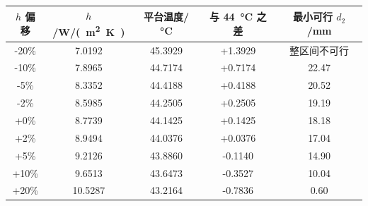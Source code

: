 \begin{tabular}{ccccc}
  \toprule
    $h$ 偏移 & $h$/\si{W/(m^2.K)} & 平台温度/\si{\celsius} & 与 \SI{44}{\celsius} 之差 & 最小可行 $d_2$/\si{mm} \\
  \midrule
    -20\% & 7.0192 & 45.3929 & +1.3929 & 整区间不可行 \\
    -10\% & 7.8965 & 44.7174 & +0.7174 & 22.47 \\
    -5\% & 8.3352 & 44.4188 & +0.4188 & 20.52 \\
    -2\% & 8.5985 & 44.2505 & +0.2505 & 19.19 \\
    +0\% & 8.7739 & 44.1425 & +0.1425 & 18.18 \\
    +2\% & 8.9494 & 44.0376 & +0.0376 & 17.04 \\
    +5\% & 9.2126 & 43.8860 & -0.1140 & 14.90 \\
    +10\% & 9.6513 & 43.6473 & -0.3527 & 10.04 \\
    +20\% & 10.5287 & 43.2164 & -0.7836 & 0.60 \\
  \bottomrule
\end{tabular}
